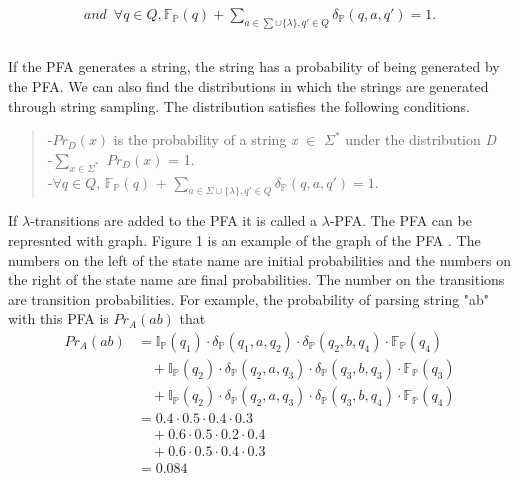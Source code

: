 \documentclass[a4paper]{article}
\begin{document}
\begin{align*}
and \enspace\forall q \in \textit{Q}, \mathbb{F_P}(q)+\sum_{a\in\sum\cup\{\lambda\}, q'\in\textit{Q}}\delta_\mathbb{P}(q,a,q') = 1.\\
\end{align*}
\\If the PFA generates a string, the string has a probability of being generated by the PFA. We can also find the distributions in which the strings are generated through string sampling. The distribution satisfies the following conditions.\\
\begin{quotation}
\noindent
-\textit{$Pr_D(x)$} is the probability of a string \textit{x} $\in$ $\Sigma^*$ under the distribution \textit{D} \\
-$\sum_{\textit{x}\in\Sigma^*}$ \textit{$Pr_D(x)$} = 1. \\
-$\forall q \in Q$, $\mathbb{F_P}(q)$ + $\sum_{a \in \Sigma\cup\{\lambda\}, q' \in Q}\delta_\mathbb{P}(q,a,q') = 1.$ \\
\end{quotation}
If $\lambda$-transitions are added to the PFA it is called a $\lambda$-PFA.
The PFA can be represnted with graph. Figure 1 is an example of the graph of the PFA \cite{de2010grammatical}. The numbers on the left of the state name are initial probabilities and the numbers on the right of the state name are final probabilities. The number on the 
transitions are transition probabilities. For example, the probability of parsing string "ab" with this PFA is  
\textit{$Pr_A(ab)$} that
\begin{align*}
Pr_A(ab)&= \mathbb{I_P}(q_1)\cdot\delta_\mathbb{P}(q_1,a,q_2)\cdot\delta_\mathbb{P}(q_2,b,q_4)\cdot\mathbb{F_P}(q_4)\nonumber\\
&\quad +\mathbb{I_P}(q_2)\cdot\delta_\mathbb{P}(q_2,a,q_3)\cdot\delta_\mathbb{P}(q_3,b,q_3)\cdot\mathbb{F_P}(q_3)\\
&\quad +\mathbb{I_P}(q_2)\cdot\delta_\mathbb{P}(q_2,a,q_3)\cdot\delta_\mathbb{P}(q_3,b,q_4)\cdot\mathbb{F_P}(q_4) \\
&= 0.4\cdot0.5\cdot0.4\cdot0.3\\
&\quad + 0.6\cdot0.5\cdot0.2\cdot0.4\\
&\quad + 0.6\cdot0.5\cdot0.4\cdot0.3 \\
&= 0.084
\end{align*}
\end{document}
